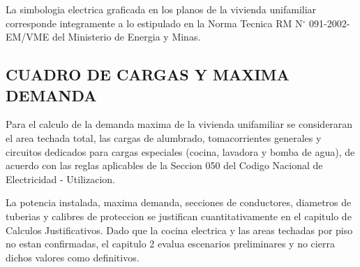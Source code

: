 La simbologia electrica graficada en los planos de la vivienda unifamiliar corresponde integramente a lo estipulado en la Norma Tecnica RM N\(^\circ\) 091-2002-EM/VME del Ministerio de Energia y Minas.

\subsection{CUADRO DE CARGAS Y MAXIMA DEMANDA}

Para el calculo de la demanda maxima de la vivienda unifamiliar se consideraran el area techada total, las cargas de alumbrado, tomacorrientes generales y circuitos dedicados para cargas especiales (cocina, lavadora y bomba de agua), de acuerdo con las reglas aplicables de la Seccion 050 del Codigo Nacional de Electricidad - Utilizacion.

La potencia instalada, maxima demanda, secciones de conductores, diametros de tuberias y calibres de proteccion se justifican cuantitativamente en el capitulo de Calculos Justificativos. Dado que la cocina electrica y las areas techadas por piso no estan confirmadas, el capitulo 2 evalua escenarios preliminares y no cierra dichos valores como definitivos.
